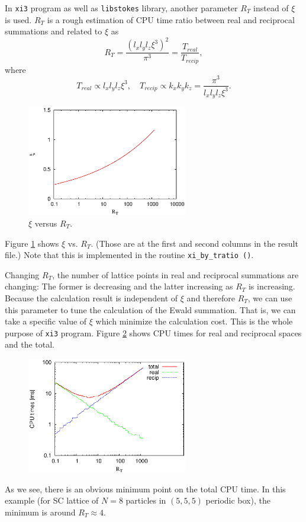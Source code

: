 \documentclass{book}
\begin{document}
In {\tt xi3} program as well as {\tt libstokes}
library, another parameter $R_T$ instead of $\xi$ is used.
$R_T$ is a rough estimation of CPU time ratio between real and reciprocal
summations and related to $\xi$ as
\begin{equation}
  R_T
  =
  \frac{
    \left(
      l_x l_y l_z
      \xi^3
    \right)^2
  }{\pi^3}   
  =
  \frac{T_{real}}{T_{recip}}
  ,
\end{equation}
where
\begin{equation}
  T_{real}
  \propto
  l_x l_y l_z
  \xi^3
  ,
  \quad
  T_{recip}
  \propto
  k_x k_y k_z
  =
  \frac{\pi^3}{l_x l_y l_z \xi^3}
  .
\end{equation}
\begin{figure}
  \centering
  \includegraphics[width=7cm]{figures/FIG-xi3-xi}
  \caption{
    $\xi$ versus $R_T$.
  }
  \label{fig:xi3-xi}
\end{figure}
Figure \ref{fig:xi3-xi} shows $\xi$ vs. $R_T$.
(Those are at the first and second columns in the result file.)
Note that this is implemented in the routine
{\tt xi\_by\_tratio ()}.



Changing $R_T$, the number of lattice points in real and reciprocal
summations are changing: The former is decreasing
and the latter increasing as $R_T$ is increasing.
Because the calculation result is independent of $\xi$ and therefore $R_T$,
we can use this parameter to tune the calculation of the Ewald summation.
That is, we can take a specific value of $\xi$ which minimize
the calculation cost.
This is the whole purpose of {\tt xi3} program.
Figure \ref{fig:xi3-CPU} shows CPU times for real and reciprocal spaces
and the total.
\begin{figure}
  \centering
  \includegraphics[width=7cm]{figures/FIG-xi3-CPU}
  \caption{
  }
  \label{fig:xi3-CPU}
\end{figure}
As we see, there is an obvious minimum point on the total CPU time.
In this example (for SC lattice of $N=8$ particles in
$(5, 5, 5)$ periodic box),
the minimum is around $R_T\approx 4$.
\end{document}
